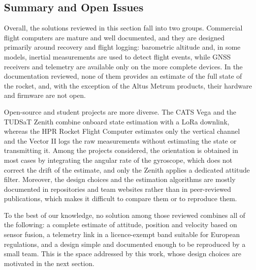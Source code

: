 
\subsection{Summary and Open Issues}

Overall, the solutions reviewed in this section fall into two groups. Commercial flight computers are mature and well documented, and they are designed primarily around recovery and flight logging: barometric altitude and, in some models, inertial measurements are used to detect flight events, while GNSS receivers and telemetry are available only on the more complete devices. In the documentation reviewed, none of them provides an estimate of the full state of the rocket, and, with the exception of the Altus Metrum products, their hardware and firmware are not open. 

Open-source and student projects are more diverse. The CATS Vega and the TUDSaT Zenith combine onboard state estimation with a LoRa downlink, whereas the HPR Rocket Flight Computer estimates only the vertical channel and the Vector II logs the raw measurements without estimating the state or transmitting it. Among the projects considered, the orientation is obtained in most cases by integrating the angular rate of the gyroscope, which does not correct the drift of the estimate, and only the Zenith applies a dedicated attitude filter. Moreover, the design choices and the estimation algorithms are mostly documented in repositories and team websites rather than in peer-reviewed publications, which makes it difficult to compare them or to reproduce them.

To the best of our knowledge, no solution among those reviewed combines all of the following: a complete estimate of attitude, position and velocity based on sensor fusion, a telemetry link in a licence-exempt band suitable for European regulations, and a design simple and documented enough to be reproduced by a small team. This is the space addressed by this work, whose design choices are motivated in the next section.
